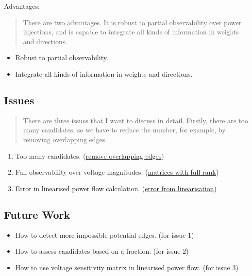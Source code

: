\documentclass[
]{book}
\providecommand{\tightlist}{%
  \setlength{\itemsep}{0pt}\setlength{\parskip}{0pt}}
\begin{document}
Advantages:

\begin{quote}
There are two advantages. It is robust to partial observability over power
injections, and is capable to integrate all kinds of information in weights
and directions.
\end{quote}

\begin{itemize}
\tightlist
\item
  Robust to partial observability.
\item
  Integrate all kinds of information in weights and directions.
\end{itemize}

\hypertarget{issues}{%
\subsection*{Issues}\label{issues}}

\begin{quote}
There are three issues that I want to discuss in detail. Firstly, there are
too many candidates, so we have to reduce the number, for example, by
removing overlapping edges.
\end{quote}

\begin{enumerate}
\def\labelenumi{\arabic{enumi}.}
\tightlist
\item
  Too many candidates. (\protect\hyperlink{overlapping}{remove overlapping edges})
\item
  Full observability over voltage magnitudes. (\protect\hyperlink{BRM}{matrices with full
  rank})
\item
  Error in linearised power flow calculation. (\protect\hyperlink{error}{error from
  linearisation})
\end{enumerate}

\hypertarget{future-work}{%
\subsection*{Future Work}\label{future-work}}

\begin{itemize}
\tightlist
\item
  How to detect more impossible potential edges. (for issue 1)
\item
  How to assess candidates based on a fraction. (for issue 2)
\item
  How to use voltage sensitivity matrix in linearised power flow. (for issue 3)
\end{itemize}

  
\end{document}
